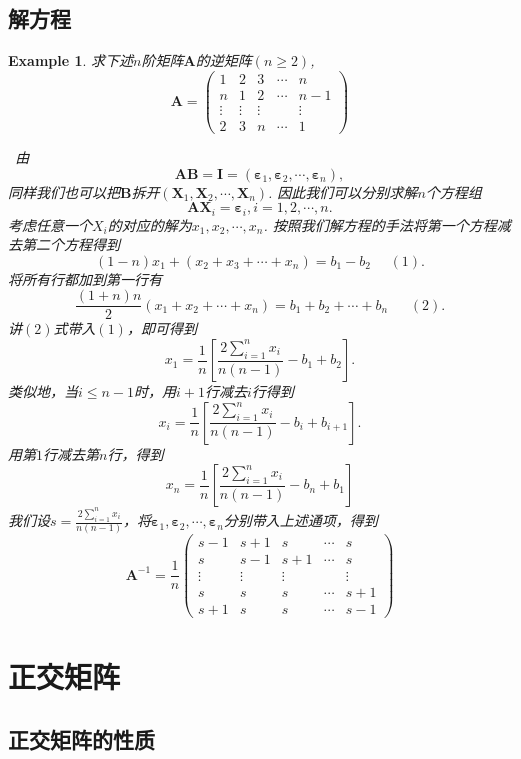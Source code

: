 \documentclass{article}
\newtheorem{example}[theorem]{Example}
\newcommand{\hints}{{\color{blue} \text{hints}}}
\newcommand{\mbf}[1]{\bm{#1}}
\begin{document}
\subsection{解方程}
\begin{example}
\rm 求下述$n$阶矩阵$\mbf{A}$的逆矩阵$(n \geq 2)$,
$$
\mbf{A} = \begin{pmatrix}
1 & 2 & 3 & \cdots & n \\
n & 1 & 2 & \cdots & n-1 \\
\vdots & \vdots & \vdots & & \vdots \\
2 & 3 & n & \cdots & 1
\end{pmatrix}
$$

\hints\ 由
$$
\mbf{A}\mbf{B} = \mbf{I} = (\mbf{\varepsilon}_1,\mbf{\varepsilon}_2,\cdots,\mbf{\varepsilon}_n),
$$
同样我们也可以把$\mbf{B}$拆开$(\mbf{X}_1,\mbf{X}_2,\cdots,\mbf{X}_n)$. 因此我们可以分别求解$n$个方程组
$$
\mbf{A}\mbf{X}_i = \mbf{\varepsilon}_i, i=1,2,\cdots,n.
$$
考虑任意一个$X_i$的对应的解为$x_1,x_2,\cdots,x_n$. 按照我们解方程的手法将第一个方程减去第二个方程得到
$$
(1-n)x_1 + (x_2+x_3+\cdots+x_n) = b_1-b_2 ~~~~~~(1).
$$
将所有行都加到第一行有
$$
\frac{(1+n)n}{2}(x_1 + x_2 + \cdots + x_n) = b_1 + b_2 + \cdots + b_n~~~~~~~(2).
$$
讲$(2)$式带入$(1)$，即可得到
$$
x_1 = \frac{1}{n}\left[\frac{2\sum\limits_{i=1}^n x_i}{n(n-1)}-b_1 + b_2 \right].
$$
类似地，当$i \leq n-1$时，用$i+1$行减去$i$行得到
$$
x_i = \frac{1}{n}\left[\frac{2\sum\limits_{i=1}^n x_i}{n(n-1)}-b_i + b_{i+1} \right].
$$
用第$1$行减去第$n$行，得到
$$
x_n =  \frac{1}{n}\left[\frac{2\sum\limits_{i=1}^n x_i}{n(n-1)}-b_n + b_{1} \right]
$$
我们设$s = \frac{2\sum\limits_{i=1}^n x_i}{n(n-1)}$，将$\mbf{\varepsilon}_1,\mbf{\varepsilon}_2,\cdots,\mbf{\varepsilon}_n$分别带入上述通项，得到
$$
\mbf{A}^{-1} = \frac{1}{n} \begin{pmatrix}
s-1 & s+1 & s & \cdots & s \\
s & s-1 & s+1 & \cdots & s \\
\vdots & \vdots & \vdots &  &\vdots \\
s & s & s & \cdots & s+1\\
s+1 & s & s & \cdots & s-1
\end{pmatrix}
$$
\end{example}

\section{正交矩阵}

\subsection{正交矩阵的性质}
\end{document}
